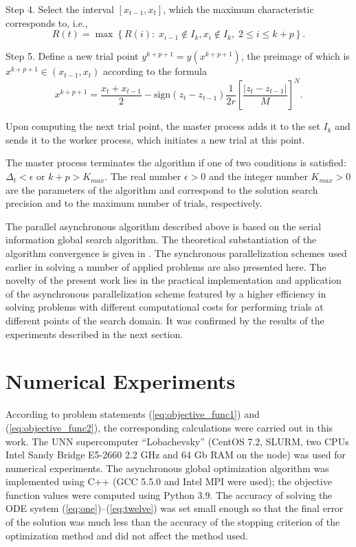 \documentclass{svproc}
\begin{document}
Step 4. Select the interval $[x_{t-1},x_t]$, which the maximum characteristic corresponds to, i.e.,
\[
R(t) = \max \left\{ R(i): \; x_{i-1} \notin I_k, x_i \notin I_k, \; 2\leq i\leq k+p \right\}.
\]

Step 5. Define a new trial point $y^{k+p+1}=y(x^{k+p+1})$, the preimage of which is $x^{k+p+1} \in (x_{t-1},x_t)$ according to the formula
\[
x^{k+p+1} = \frac{x_{t}+x_{t-1}}{2} - \mathrm{sign}(z_{t}-z_{t-1})\frac{1}{2r}\left[\frac{\left|z_{t}-z_{t-1}\right|}{M}\right]^N.
\]

Upon computing the next trial point, the master process adds it to the set $I_k$ and sends it to the worker process, which initiates a new trial at this point. 

The master process terminates the algorithm if one of two conditions is satisfied: $\Delta_{t}<\epsilon$ or $k+p>K_{max}$.
The real number $\epsilon>0$ and the integer number $K_{max}>0$ are the parameters of the algorithm and correspond to the solution search precision and to the maximum number of trials, respectively.

The parallel asynchronous algorithm described above is based on the serial information global search algorithm. The theoretical substantiation of the algorithm convergence is given in \cite{Strongin2000}. The synchronous parallelization schemes used earlier in solving a number of applied problems \cite{Kalyulin2017,Modorskii2016} are also presented here.
The novelty of the present work lies in the practical implementation and application of the asynchronous parallelization scheme featured by a higher efficiency in solving problems with different computational costs for performing trials at different points of the search domain. 
It was confirmed by the results of the experiments described in the next section.

\section{Numerical Experiments}\label{Sec_Exp}

According to problem statements (\ref{eq:objective_func1}) and (\ref{eq:objective_func2}), the corresponding calculations were carried out in this work.
The UNN supercomputer ``Lobachevsky'' (CentOS 7.2, SLURM, two CPUs Intel Sandy Bridge E5-2660 2.2 GHz and 64 Gb RAM on the node) was used for numerical experiments. The asynchronous global optimization algorithm was implemented using C++ (GCC 5.5.0 and Intel MPI were used); the objective function values were computed using Python 3.9.
The accuracy of solving the ODE system (\ref{eq:one})--(\ref{eq:twelve}) was set small enough so that the final error of the solution was much less than the accuracy of the stopping criterion of the optimization method and did not affect the method used.
\end{document}
